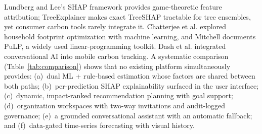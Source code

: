 \documentclass[conference]{IEEEtran}
\begin{document}
Lundberg and Lee's SHAP framework \cite{lundberg2017} provides game-theoretic feature attribution; TreeExplainer makes exact TreeSHAP tractable for tree ensembles, yet consumer carbon tools rarely integrate it. Chatterjee et al. \cite{chatterjee2022} explored household footprint optimization with machine learning, and Mitchell \cite{mitchell2023pulp} documents PuLP, a widely used linear-programming toolkit. Dash et al. \cite{dash2025} integrated conversational AI into mobile carbon tracking. A systematic comparison (Table~\ref{tab:comparison}) shows that no existing platform simultaneously provides: (a)~dual ML + rule-based estimation whose factors are shared between both paths; (b)~per-prediction SHAP explainability surfaced in the user interface; (c)~dynamic, impact-ranked recommendation planning with goal support; (d)~organization workspaces with two-way invitations and audit-logged governance; (e)~a grounded conversational assistant with an automatic fallback; and (f)~data-gated time-series forecasting with visual history.

\begin{table}[!t]
\caption{Comparison of CarbonSense with Existing Platforms}
\label{tab:comparison}
\centering
\small
{}
\end{table}
\end{document}
